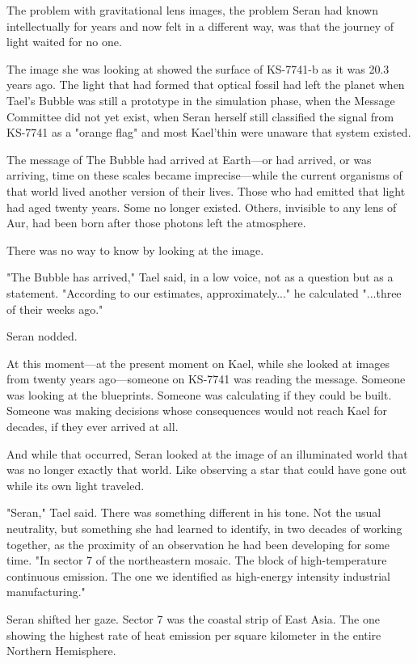 \documentclass[11pt,a5paper,twoside]{book}
\begin{document}
The problem with gravitational lens images, the problem Seran had known intellectually for years and now felt in a different way, was that the journey of light waited for no one.

The image she was looking at showed the surface of KS-7741-b as it was 20.3 years ago. The light that had formed that optical fossil had left the planet when Tael's Bubble was still a prototype in the simulation phase, when the Message Committee did not yet exist, when Seran herself still classified the signal from KS-7741 as a "orange flag" and most Kael'thin were unaware that system existed.

The message of The Bubble had arrived at Earth—or had arrived, or was arriving, time on these scales became imprecise—while the current organisms of that world lived another version of their lives. Those who had emitted that light had aged twenty years. Some no longer existed. Others, invisible to any lens of Aur, had been born after those photons left the atmosphere.

There was no way to know by looking at the image.

"The Bubble has arrived," Tael said, in a low voice, not as a question but as a statement. "According to our estimates, approximately..." he calculated "...three of their weeks ago."

Seran nodded.

At this moment—at the present moment on Kael, while she looked at images from twenty years ago—someone on KS-7741 was reading the message. Someone was looking at the blueprints. Someone was calculating if they could be built. Someone was making decisions whose consequences would not reach Kael for decades, if they ever arrived at all.

And while that occurred, Seran looked at the image of an illuminated world that was no longer exactly that world. Like observing a star that could have gone out while its own light traveled.

"Seran," Tael said. There was something different in his tone. Not the usual neutrality, but something she had learned to identify, in two decades of working together, as the proximity of an observation he had been developing for some time. "In sector 7 of the northeastern mosaic. The block of high-temperature continuous emission. The one we identified as high-energy intensity industrial manufacturing."

Seran shifted her gaze. Sector 7 was the coastal strip of East Asia. The one showing the highest rate of heat emission per square kilometer in the entire Northern Hemisphere.
\end{document}
